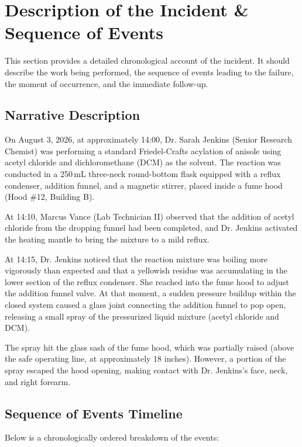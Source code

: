 \section{Description of the Incident \& Sequence of Events}
\thinrule

\vspace{0.5em}

This section provides a detailed chronological account of the incident. It should describe the work being performed, the sequence of events leading to the failure, the moment of occurrence, and the immediate follow-up.

\subsection{Narrative Description}
On August 3, 2026, at approximately 14:00, Dr. Sarah Jenkins (Senior Research Chemist) was performing a standard Friedel-Crafts acylation of anisole using acetyl chloride and dichloromethane (DCM) as the solvent. The reaction was conducted in a 250\,mL three-neck round-bottom flask equipped with a reflux condenser, addition funnel, and a magnetic stirrer, placed inside a fume hood (Hood \#12, Building B).

At 14:10, Marcus Vance (Lab Technician II) observed that the addition of acetyl chloride from the dropping funnel had been completed, and Dr. Jenkins activated the heating mantle to bring the mixture to a mild reflux.

At 14:15, Dr. Jenkins noticed that the reaction mixture was boiling more vigorously than expected and that a yellowish residue was accumulating in the lower section of the reflux condenser. She reached into the fume hood to adjust the addition funnel valve. At that moment, a sudden pressure buildup within the closed system caused a glass joint connecting the addition funnel to pop open, releasing a small spray of the pressurized liquid mixture (acetyl chloride and DCM).

The spray hit the glass sash of the fume hood, which was partially raised (above the safe operating line, at approximately 18 inches). However, a portion of the spray escaped the hood opening, making contact with Dr. Jenkins's face, neck, and right forearm.

\subsection{Sequence of Events Timeline}
Below is a chronologically ordered breakdown of the events:

